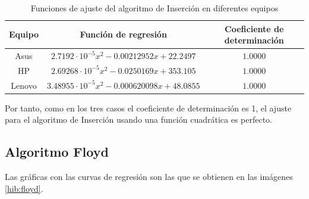 \documentclass{homework}
\begin{document}
    \begin{table}[H]
        \centering
        \begin{tabular}{|c|c|c|}
            \hline
            Equipo & Función de regresión & Coeficiente de determinación \\
            \hline
            Asus & $2.7192 \cdot 10^{-5} x^2 - 0.00212952 x + 22.2497$ & $1.0000$ \\
            HP & $2.69268 \cdot 10^{-5} x^2 - 0.0250169 x + 353.105$ &  $1.0000$ \\
            Lenovo & $3.48955 \cdot 10^{-5} x^{2} - 0.000620098 x + 48.0855$ & $1.0000$ \\
            \hline
        \end{tabular}
        \caption{Funciones de ajuste del algoritmo de Inserción en diferentes equipos}
    \end{table} 

    Por tanto, como en los tres casos el coeficiente de determinación es 1, el ajuste para el algoritmo de Inserción 
    usando una función cuadrática es perfecto.

    \subsection{Algoritmo Floyd}

    Las gráficas con las curvas de regresión son las que se obtienen en las imágenes \ref{hib:floyd}.
\end{document}
